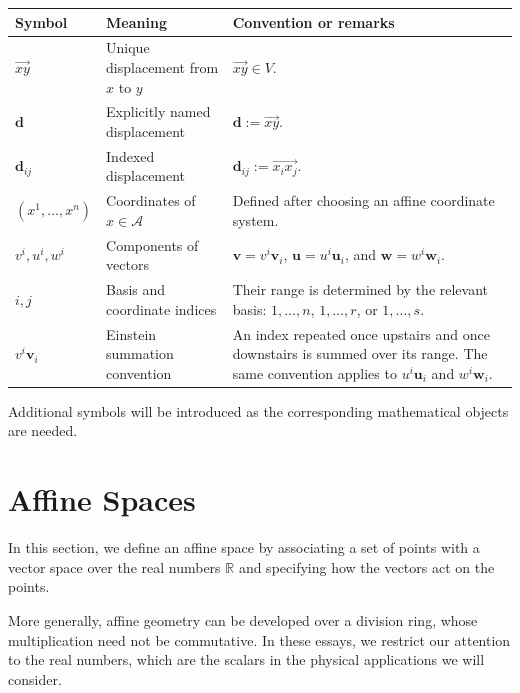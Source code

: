 \documentclass[12pt]{article}
\begin{document}
\begin{center}
\begin{tabular}{lll}
Symbol & Meaning & Convention or remarks \\
\hline
\(\overrightarrow{xy}\) & Unique displacement from \(x\) to \(y\) & \(\overrightarrow{xy}\in V\). \\
\(\mathbf d\) & Explicitly named displacement & \(\mathbf d:=\overrightarrow{xy}\). \\
\(\mathbf d_{ij}\) & Indexed displacement & \(\mathbf d_{ij}:=\overrightarrow{x_i x_j}\). \\
\((x^1,\ldots,x^n)\) & Coordinates of \(x\in\mathcal A\) & Defined after choosing an affine coordinate system. \\
\(v^i,u^i,w^i\) & Components of vectors & \(\mathbf v=v^i\mathbf v_i\), \(\mathbf u=u^i\mathbf u_i\), and \(\mathbf w=w^i\mathbf w_i\). \\
\(i,j\) & Basis and coordinate indices & Their range is determined by the relevant basis: \(1,\ldots,n\), \(1,\ldots,r\), or \(1,\ldots,s\). \\
\(v^i\mathbf v_i\) & Einstein summation convention & An index repeated once upstairs and once downstairs is summed over its range. The same convention applies to \(u^i\mathbf u_i\) and \(w^i\mathbf w_i\). \\
\end{tabular}
\end{center}

Additional symbols will be introduced as the corresponding mathematical
objects are needed.

\section{Affine Spaces}

In this section, we define an affine space by associating a set of
points with a vector space over the real numbers $\mathbb{R}$ and
specifying how the vectors act on the points.

More generally, affine geometry can be developed over a division ring,
whose multiplication need not be commutative. In these essays, we
restrict our attention to the real numbers, which are the scalars in
the physical applications we will consider.
\end{document}
